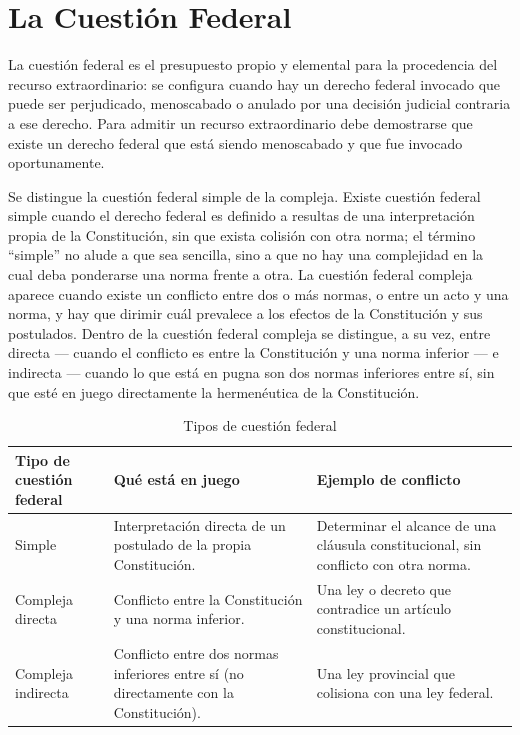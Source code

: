 \documentclass[12pt,oneside]{book}
\begin{document}
\section{La Cuestión Federal}

La cuestión federal es el presupuesto propio y elemental para la procedencia del recurso extraordinario: se configura cuando hay un derecho federal invocado que puede ser perjudicado, menoscabado o anulado por una decisión judicial contraria a ese derecho. Para admitir un recurso extraordinario debe demostrarse que existe un derecho federal que está siendo menoscabado y que fue invocado oportunamente.

Se distingue la cuestión federal simple de la compleja. Existe cuestión federal simple cuando el derecho federal es definido a resultas de una interpretación propia de la Constitución, sin que exista colisión con otra norma; el término ``simple'' no alude a que sea sencilla, sino a que no hay una complejidad en la cual deba ponderarse una norma frente a otra. La cuestión federal compleja aparece cuando existe un conflicto entre dos o más normas, o entre un acto y una norma, y hay que dirimir cuál prevalece a los efectos de la Constitución y sus postulados. Dentro de la cuestión federal compleja se distingue, a su vez, entre directa --- cuando el conflicto es entre la Constitución y una norma inferior --- e indirecta --- cuando lo que está en pugna son dos normas inferiores entre sí, sin que esté en juego directamente la hermenéutica de la Constitución.

\begin{table}[H]
\centering
\caption{Tipos de cuestión federal}
\begin{tabularx}{\textwidth}{>{\raggedright\arraybackslash}p{} X X}
\toprule
\textbf{Tipo de cuestión federal} & \textbf{Qué está en juego} & \textbf{Ejemplo de conflicto} \\
\midrule
Simple & Interpretación directa de un postulado de la propia Constitución. & Determinar el alcance de una cláusula constitucional, sin conflicto con otra norma. \\
Compleja directa & Conflicto entre la Constitución y una norma inferior. & Una ley o decreto que contradice un artículo constitucional. \\
Compleja indirecta & Conflicto entre dos normas inferiores entre sí (no directamente con la Constitución). & Una ley provincial que colisiona con una ley federal. \\
\bottomrule
\end{tabularx}
\end{table}
\end{document}
